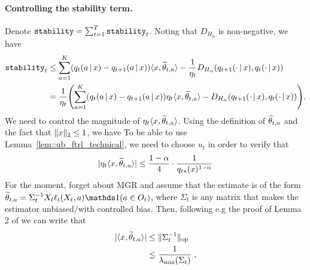 \paragraph{Controlling the stability term.} Denote $\texttt{stability} = \sum_{t=1}^T \texttt{stability}_t$. Noting that $D_{H_{\bar\alpha}}$ is non-negative, we have
%
\begin{align*}
    \stabt &\leq \sumaK \spr*{q_t \spr*{a \given x} - q_{t+1} \spr*{a \given x}} \inp{x, \wt \theta_{t, a}} - \frac{1}{\eta_t} D_{H_\alpha} \spr*{q_{t+1} \spr*{\cdot \given x}, q_t \spr*{\cdot \given x}}\\
    &= \frac{1}{\eta_t} \spr*{\sumaK \spr*{q_t \spr*{a \given x} - q_{t+1} \spr*{a \given x}} \eta_t \inp{x, \wt \theta_{t, a}} - D_{H_\alpha} \spr*{q_{t+1} \spr*{\cdot \given x}, q_t \spr*{\cdot \given x}}}.
\end{align*}
%
We need to control the magnitude of $\eta_t \langle x, \widetilde{\theta}_{t, a}\rangle$. Using the definition of $\widetilde{\theta}_{t, a}$ and the fact that $\lVert x\rVert_2 \leq 1$, we have 
To be able to use Lemma~\ref{lem::ub_ftrl_technical}, we need to choose $u_t$ in order to verify that 
%
\begin{equation}\label{eq::as_bound}
    \lvert\eta_t \langle x, \widetilde{\theta}_{t, a}\rangle\rvert \leq \frac{1 - \alpha}{4} \cdot \frac{1}{q_{t\star}(x)^{1 - \alpha}}
\end{equation}
For the moment, forget about MGR and assume that the estimate is of the form $\wt \theta_{t,a} = \Sigma_t^{-1}X_t\ell_t(X_t, a)\ind(a\in O_t)$, where $\Sigma_t$ is any matrix that makes the estimator unbiased/with controlled bias. Then, following e.g the proof of Lemma 2 of \cite{BOBWlinear} we can write that 
\begin{align*}
	\lvert\langle x, \widetilde{\theta}_{t,a}\rangle\rvert &\leq \lVert\Sigma_t^{-1}\rVert_{\text{op}} \\
	& \leq  \frac{1}{\lambda_{\min}(\Sigma_t)} \;, \\
\end{align*}
